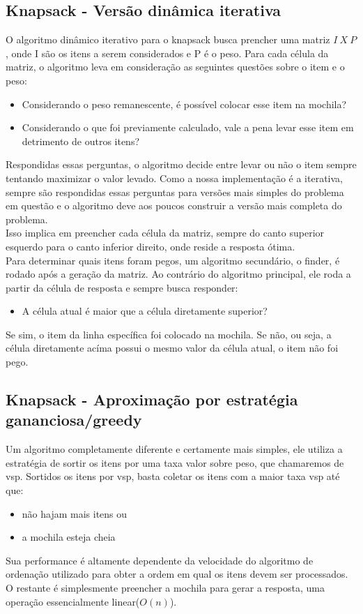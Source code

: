 \documentclass{article}
\begin{document}
    \subsection{Knapsack - Versão dinâmica iterativa}
    O algoritmo dinâmico iterativo para o knapsack busca prencher uma matriz $I\ X\ P$, onde I são os itens a serem considerados e P é o peso. Para cada célula da matriz, o algoritmo leva em consideração as seguintes questões sobre o item e o peso:
    \begin{itemize}
        \item Considerando o peso remanescente, é possível colocar esse item na mochila?
        \item Considerando o que foi previamente calculado, vale a pena levar esse item em detrimento de outros itens?
    \end{itemize}
    Respondidas essas perguntas, o algoritmo decide entre levar ou não o item sempre tentando maximizar o valor levado. Como a nossa implementação é a iterativa, sempre são respondidas essas perguntas para versões mais simples do problema em questão e o algoritmo deve aos poucos construir a versão mais completa do problema.\\
    Isso implica em preencher cada célula da matriz, sempre do canto superior esquerdo para o canto inferior direito, onde reside a resposta ótima.\\
    Para determinar quais itens foram pegos, um algoritmo secundário, o finder, é rodado após a geração da matriz. Ao contrário do algoritmo principal, ele roda a partir da célula de resposta e sempre busca responder:
    \begin{itemize}
        \item A célula atual é maior que a célula diretamente superior?
    \end{itemize}
    Se sim, o item da linha específica foi colocado na mochila. Se não, ou seja, a célula diretamente acíma possui o mesmo valor da célula atual, o item não foi pego.
    
    \subsection{Knapsack - Aproximação por estratégia gananciosa/greedy}
    Um algoritmo completamente diferente e certamente mais simples, ele utiliza a estratégia de sortir os itens por uma taxa valor sobre peso, que chamaremos de vsp. Sortidos os itens por vsp, basta coletar os itens com a maior taxa vsp até que:
    \begin{itemize}
        \item não hajam mais itens ou
        \item a mochila esteja cheia
    \end{itemize}
    Sua performance é altamente dependente da velocidade do algoritmo de ordenação utilizado para obter a ordem em qual os itens devem ser processados. O restante é simplesmente preencher a mochila para gerar a resposta, uma operação essencialmente linear($O(n)$). 
\end{document}
